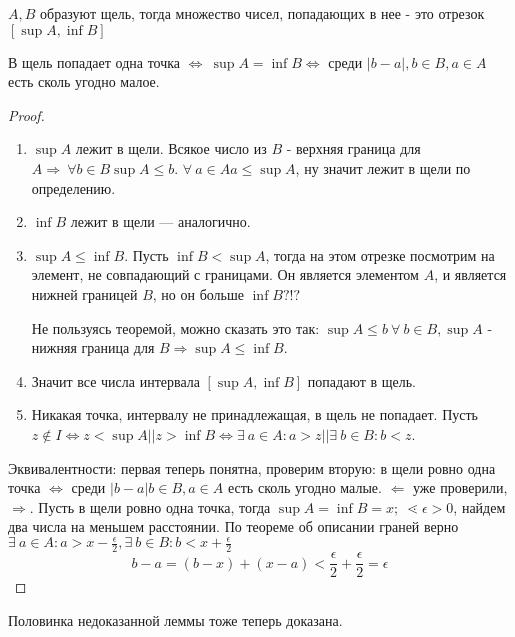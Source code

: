 \documentclass[12pt]{report}
\begin{document}
\begin{thm}
$A, B$ образуют щель, тогда множество чисел, попадающих в нее - это отрезок $[\sup{A}, \inf{B}]$

В щель попадает одна точка $\Leftrightarrow ~\sup{A} = \inf{B} \Leftrightarrow$ среди $|b - a|, b \in B, a \in A$ есть сколь угодно малое.
\end{thm}
\begin{proof}
\begin{enumerate}
\item $\sup{A}$ лежит в щели. Всякое число из $B$ - верхняя граница для $A \Rightarrow ~\forall b \in B \sup{A} \le b$. $\forall ~a \in A  a \le \sup{A}$, ну значит лежит в щели по определению.

\item $\inf{B}$ лежит в щели --- аналогично.

\item $\sup{A} \le \inf{B}$. Пусть $\inf{B} < \sup{A}$, тогда на этом отрезке посмотрим на элемент, не совпадающий с границами. Он является элементом $A$, и является нижней границей $B$, но он больше $\inf{B} ?!?$

Не пользуясь теоремой, можно сказать это так: $\sup{A} \le b ~\forall ~b \in B, \sup{A}$ - нижняя граница для $B \Rightarrow \sup{A} \le \inf{B}$.

\item Значит все числа интервала $[\sup{A}, \inf{B}]$ попадают в щель.

\item Никакая точка, интервалу не принадлежащая, в щель не попадает. Пусть $z \notin I \Leftrightarrow z < \sup{A} || z > \inf{B} \Leftrightarrow \exists ~a \in A: a > z || \exists ~b \in B: b < z$.
\end{enumerate}

Эквивалентности: первая теперь понятна, проверим вторую:
в щели ровно одна точка $\Leftrightarrow$ среди $|b - a| b \in B, a \in A$ есть сколь угодно малые. $\Leftarrow$ уже проверили, $\Rightarrow$. Пусть в щели ровно одна точка, тогда $\sup{A} = \inf{B} = x; ~\lessdot \epsilon > 0$, найдем два числа на меньшем расстоянии. По теореме об описании граней верно $\exists ~ a \in A: a > x - \frac{\epsilon}{2}, \exists ~ b \in B: b < x + \frac{\epsilon}{2}$
$$b - a = (b - x) + (x - a) < \frac{\epsilon}{2} + \frac{\epsilon}{2} = \epsilon$$
\end{proof}

\begin{rem}
Половинка недоказанной леммы тоже теперь доказана.
\end{rem}
\end{document}
